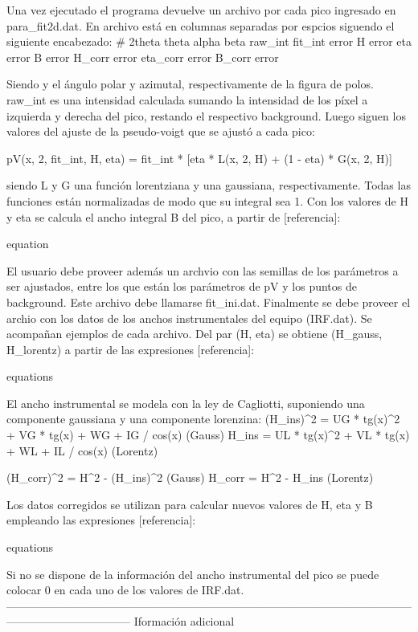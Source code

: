 Una vez ejecutado el programa devuelve un archivo por cada pico ingresado en para_fit2d.dat. En archivo está en columnas separadas por espcios siguendo el siguiente encabezado:
#    2theta theta  alpha  beta     raw_int fit_int  error   H        error   eta      error   B        error   H_corr   error   eta_corr error   B_corr   error

Siendo \alpha y \beta el ángulo polar y azimutal, respectivamente de la figura de polos. raw_int es una intensidad calculada sumando la intensidad de los píxel a izquierda y derecha del pico, restando el respectivo background.
Luego siguen los valores del ajuste de la pseudo-voigt que se ajustó a cada pico:

pV(x, 2\theta, fit_int, H, eta) = fit_int * [eta * L(x, 2\theta, H) + (1 - eta) * G(x, 2\theta, H)]

siendo L y G una función lorentziana y una gaussiana, respectivamente. Todas las funciones están normalizadas de modo que su integral sea 1. Con los valores de H y eta se calcula el ancho integral B del pico, a partir de [referencia]:

equation

El usuario debe proveer además un archvio con las semillas de los parámetros a ser ajustados, entre los que están los parámetros de pV y los puntos de background. Este archivo debe llamarse fit_ini.dat.
Finalmente se debe proveer el archio con los datos de los anchos instrumentales del equipo (IRF.dat). Se acompañan ejemplos de cada archivo.
Del par (H, eta) se obtiene (H_{gauss}, H_{lorentz}) a partir de las expresiones [referencia]:

equations

El ancho instrumental se modela con la ley de Cagliotti, suponiendo una componente gaussiana y una componente lorenzina:
(H_ins)^2 = UG * tg(x)^2 + VG * tg(x) + WG + IG / cos(x)  (Gauss)
H_ins = UL * tg(x)^2 + VL * tg(x) + WL + IL / cos(x)  (Lorentz)

(H_corr)^2 = H^2 - (H_ins)^2 (Gauss)
H_corr = H^2 - H_ins (Lorentz)

Los datos corregidos se utilizan para calcular nuevos valores de H, eta y B empleando las expresiones [referencia]:

equations

Si no se dispone de la información del ancho instrumental del pico se puede colocar 0 en cada uno de los valores de IRF.dat.
---------------------------------------------------------------------------------------------------------------------------------------------
Iformación adicional

